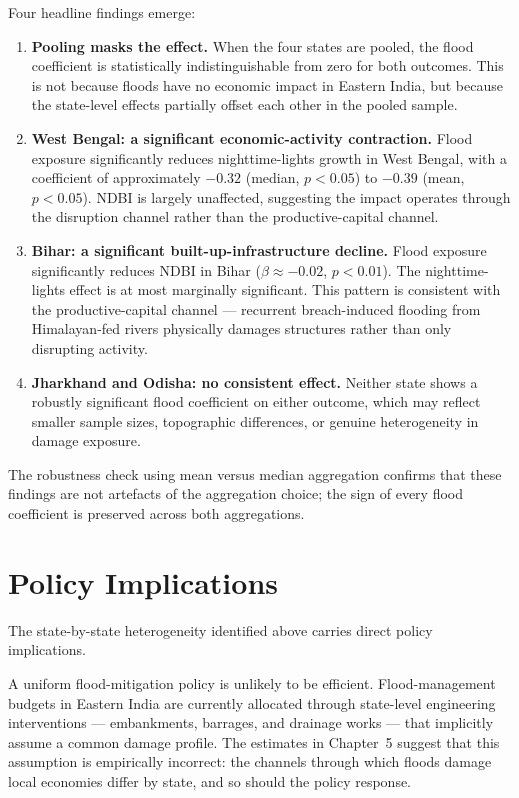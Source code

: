 \documentclass[12pt,a4paper,oneside]{report}
\begin{document}
Four headline findings emerge:
\begin{enumerate}[label=(\roman*),leftmargin=2.2em,itemsep=4pt]
\item \textbf{Pooling masks the effect.} When the four states are pooled, the flood coefficient is statistically indistinguishable from zero for both outcomes. This is not because floods have no economic impact in Eastern India, but because the state-level effects partially offset each other in the pooled sample.
\item \textbf{West Bengal: a significant economic-activity contraction.} Flood exposure significantly reduces nighttime-lights growth in West Bengal, with a coefficient of approximately $-0.32$ (median, $p<0.05$) to $-0.39$ (mean, $p<0.05$). NDBI is largely unaffected, suggesting the impact operates through the disruption channel rather than the productive-capital channel.
\item \textbf{Bihar: a significant built-up-infrastructure decline.} Flood exposure significantly reduces NDBI in Bihar ($\beta \approx -0.02$, $p<0.01$). The nighttime-lights effect is at most marginally significant. This pattern is consistent with the productive-capital channel --- recurrent breach-induced flooding from Himalayan-fed rivers physically damages structures rather than only disrupting activity.
\item \textbf{Jharkhand and Odisha: no consistent effect.} Neither state shows a robustly significant flood coefficient on either outcome, which may reflect smaller sample sizes, topographic differences, or genuine heterogeneity in damage exposure.
\end{enumerate}

The robustness check using mean versus median aggregation confirms that these findings are not artefacts of the aggregation choice; the sign of every flood coefficient is preserved across both aggregations.

\section{Policy Implications}
The state-by-state heterogeneity identified above carries direct policy implications.

A uniform flood-mitigation policy is unlikely to be efficient. Flood-management budgets in Eastern India are currently allocated through state-level engineering interventions --- embankments, barrages, and drainage works --- that implicitly assume a common damage profile. The estimates in Chapter~5 suggest that this assumption is empirically incorrect: the channels through which floods damage local economies differ by state, and so should the policy response.
\end{document}
